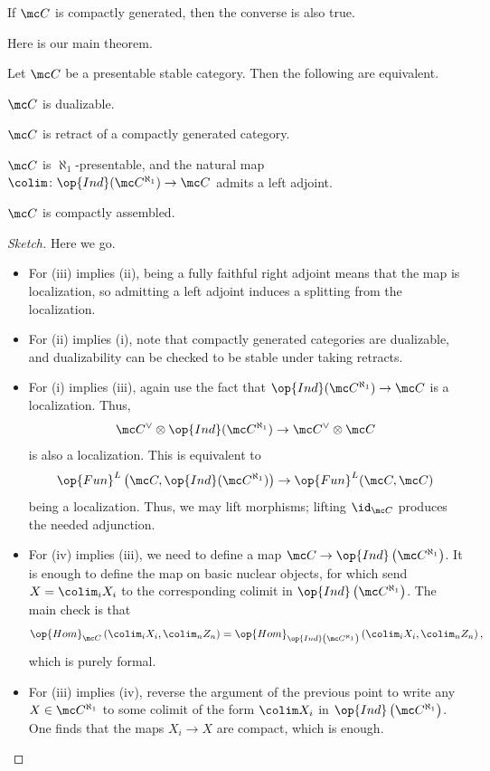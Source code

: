\documentclass[../notes.tex]{subfiles}
\begin{document}
\begin{remark}
	If $\mc C$ is compactly generated, then the converse is also true.
\end{remark}
Here is our main theorem.
\begin{theorem} \label{thm:dualizable-grab-bag}
	Let $\mc C$ be a presentable stable category. Then the following are equivalent.
	\begin{listroman}
		\item $\mc C$ is dualizable.
		\item $\mc C$ is retract of a compactly generated category.
		\item $\mc C$ is $\aleph_1$-presentable, and the natural map $\colim\colon\op{Ind}(\mc C^{\aleph_1})\to\mc C$ admits a left adjoint.
		\item $\mc C$ is compactly assembled.
	\end{listroman}
\end{theorem}
\begin{proof}[Sketch]
	Here we go.
	\begin{itemize}
		\item For (iii) implies (ii), being a fully faithful right adjoint means that the map is localization, so admitting a left adjoint induces a splitting from the localization.
		\item For (ii) implies (i), note that compactly generated categories are dualizable, and dualizability can be checked to be stable under taking retracts.
		\item For (i) implies (iii), again use the fact that $\op{Ind}(\mc C^{\aleph_1})\to\mc C$ is a localization. Thus,
		\[\mc C^\lor\otimes\op{Ind}(\mc C^{\aleph_1})\to\mc C^\lor\otimes\mc C\]
		is also a localization. This is equivalent to
		\[\op{Fun}^L\left(\mc C,\op{Ind}(\mc C^{\aleph_1})\right)\to\op{Fun}^L(\mc C,\mc C)\]
		being a localization. Thus, we may lift morphisms; lifting $\id_{\mc C}$ produces the needed adjunction.
		\item For (iv) implies (iii), we need to define a map $\mc C\to\op{Ind}\left(\mc C^{\aleph_1}\right)$. It is enough to define the map on basic nuclear objects, for which send $X=\colim_iX_i$ to the corresponding colimit in $\op{Ind}\left(\mc C^{\aleph_1}\right)$. The main check is that
		\[\op{Hom}_{\mc C}\left(\colim_iX_i,\colim_nZ_n\right)=\op{Hom}_{\op{Ind}\left(\mc C^{\aleph_1}\right)}\left(\colim_iX_i,\colim_nZ_n\right),\]
		which is purely formal.
		\item For (iii) implies (iv), reverse the argument of the previous point to write any $X\in\mc C^{\aleph_1}$ to some colimit of the form $\colim X_i$ in $\op{Ind}\left(\mc C^{\aleph_1}\right)$. One finds that the maps $X_i\to X$ are compact, which is enough.
		\qedhere
	\end{itemize}
\end{proof}
\end{document}
